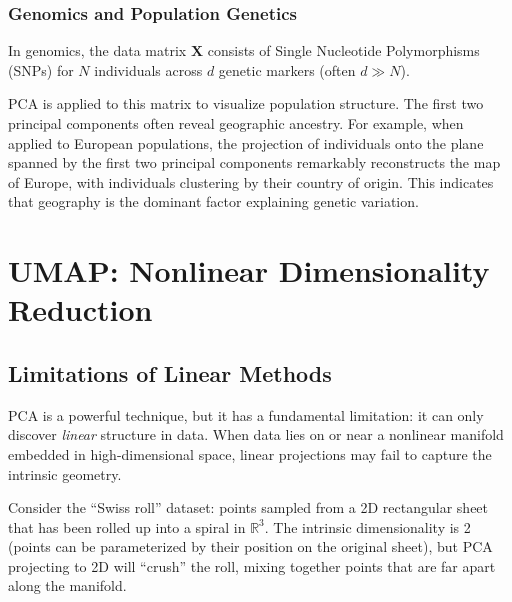 \subsubsection{Genomics and Population Genetics}
In genomics, the data matrix $\mathbf{X}$ consists of Single Nucleotide Polymorphisms (SNPs) for $N$ individuals across $d$ genetic markers (often $d \gg N$).

PCA is applied to this matrix to visualize population structure. The first two principal components often reveal geographic ancestry. For example, when applied to European populations, the projection of individuals onto the plane spanned by the first two principal components remarkably reconstructs the map of Europe, with individuals clustering by their country of origin. This indicates that geography is the dominant factor explaining genetic variation.


\section{UMAP: Nonlinear Dimensionality Reduction}

\subsection{Limitations of Linear Methods}

PCA is a powerful technique, but it has a fundamental limitation: it can only discover \emph{linear} structure in data. When data lies on or near a nonlinear manifold embedded in high-dimensional space, linear projections may fail to capture the intrinsic geometry.

\begin{example}
  Consider the ``Swiss roll'' dataset: points sampled from a 2D rectangular sheet that has been rolled up into a spiral in $\mathbb{R}^3$. The intrinsic dimensionality is 2 (points can be parameterized by their position on the original sheet), but PCA projecting to 2D will ``crush'' the roll, mixing together points that are far apart along the manifold.
\end{example}

